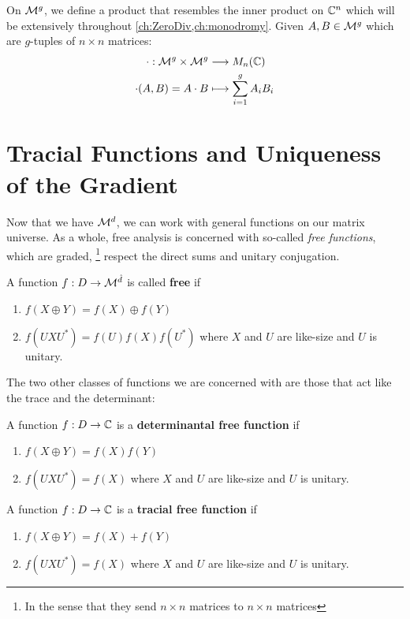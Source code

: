 On \(\mathcal{M}^{g} \), we define a product that resembles the inner product on
\(\mathbb{C}^n\) which will be extensively throughout \cref{ch:ZeroDiv,ch:monodromy}. Given \(A,B \in \mathcal{M}^{g} \) which are \(g\)-tuples of \(n \times n\)
matrices:
\begin{align*}
	\cdot : \mathcal{M}^{g} \times \mathcal{M}^{g}  &\longrightarrow M_n(\mathbb{C}) \\
  \cdot (A,B) = A \cdot B &\longmapsto \sum_{i=1}^g A_i B_i
\end{align*}



\section{Tracial Functions and Uniqueness of the Gradient}%
\label{sec:TracGrad}
Now that we have \(\mathcal{M}^d\), we can work with general functions on our matrix
universe. As a whole, free analysis is concerned with so-called \emph{free
  functions}, which are graded,
\footnote{In the sense that they send \(n\times n\) matrices to \(n\times n\) matrices}
respect the direct sums and unitary conjugation.

\begin{definition}
\label{def:FreeFun}
  A function \(f: D\to \mathcal{M}^{\hat{d}}\) is called \textbf{free} if
  \begin{enumerate}
    \item \(f(X\oplus Y)= f(X) \oplus f(Y)\)
    \item \(f(U X U^*) = f(U)f(X)f(U^*)\) where \(X\) and \(U\) are like-size
          and \(U\) is unitary.
  \end{enumerate}
\end{definition}

The two other classes of functions we are concerned with are those that act like
the trace and the determinant:
\begin{definition}
  \label{def:DetFreeFun}
  A function \(f: D \to \mathbb{C} \) is a \textbf{determinantal free function} if
  \begin{enumerate}
    \item \(f(X\oplus Y) = f(X)f(Y)\)
    \item \(f(U X U^*) = f(X)\) where \(X\) and \(U\) are like-size
          and \(U\) is unitary.
  \end{enumerate}
\end{definition}

\begin{definition}
  \label{def:TrFreeFun}
  A function \(f: D \to \mathbb{C} \) is a \textbf{tracial free function} if
  \begin{enumerate}
    \item \(f(X\oplus Y) = f(X)+f(Y)\)
    \item \(f(U X U^*) = f(X)\) where \(X\) and \(U\) are like-size
          and \(U\) is unitary.
  \end{enumerate}
\end{definition}

